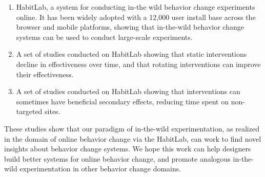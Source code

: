 \begin{enumerate}
\item HabitLab, a system for conducting in-the wild behavior change experiments online. It has been widely adopted with a 12,000 user install base across the browser and mobile platforms, showing that in-the-wild behavior change systems can be used to conduct large-scale experiments.
\item A set of studies conducted on HabitLab showing that static interventions decline in effectiveness over time, and that rotating interventions can improve their effectiveness.
\item A set of studies conducted on HabitLab showing that interventions can sometimes have beneficial secondary effects, reducing time spent on non-targeted sites.
\end{enumerate}


These studies show that our paradigm of in-the-wild experimentation, as realized in the domain of online behavior change via the HabitLab, can work to find novel insights about behavior change systems. We hope this work can help designers build better systems for online behavior change, and promote analogous in-the-wild experimentation in other behavior change domains.




